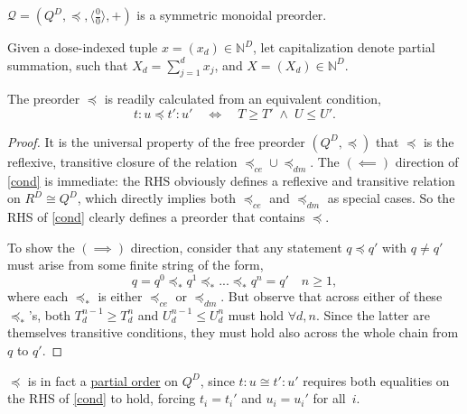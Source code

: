 \documentclass{article}
\newcommand{\N}{\mathbb{N}}
\newcommand{\Q}{\ensuremath{\mathcal{Q}}}
\begin{document}
\begin{fact}\label{symon}
  $\Q = (Q^D,\preceq,\langle\frac{0}{0}\rangle,+)$ is a symmetric monoidal preorder.
\end{fact}

\begin{nota}
  Given a dose-indexed tuple $x = (x_d) \in \N^D$, let capitalization denote partial summation, such that $X_d = \sum_{j=1}^d x_j$, and $X = (X_d) \in \N^D$.
\end{nota}

\begin{fact}
  The preorder $\preceq$ is readily calculated from an equivalent condition,
  \begin{equation}
  t\!:\!u \preceq t'\!:\!u' \quad\iff\quad T \ge T' \;\wedge\; U \le U'.\label{cond}
  \end{equation}
\end{fact}
\begin{proof}
  It is the universal property of the free preorder $(Q^D, \preceq)$ that $\preceq$ is the reflexive, transitive closure of the relation $\preceq_{ce} \cup \preceq_{dm}$.  The $(\!\impliedby\!)$ direction of \eqref{cond} is immediate: the RHS obviously defines a reflexive and transitive relation on $R^D \cong Q^D$, which directly implies both $\preceq_{ce}$ and $\preceq_{dm}$ as special cases.  So the RHS of \eqref{cond} clearly defines a preorder that contains $\preceq$.

  To show the $(\!\implies\!)$ direction, consider that any statement $q \preceq q'$ with $q \neq q'$ must arise from some finite string of the form,
  \begin{equation}
  q = q^0 \preceq_* q^1 \preceq_* ... \preceq_* q^n = q' \quad n \ge 1, \label{string}
  \end{equation}
  where each $\preceq_*$ is either $\preceq_{ce}$ or $\preceq_{dm}$.  But observe that across either of these $\preceq_*$'s, both $T_d^{n-1} \ge T_d^n$ and $U_d^{n-1} \le U_d^n$ must hold $\forall d, n$.  Since the latter are themselves transitive conditions, they must hold also across the whole chain from $q$ to $q'$.  
\end{proof}

\begin{corr}\label{partord}
  $\preceq$ is in fact a \underline{partial order} on $Q^D$, since $t\!:\!u \cong t'\!:\!u'$ requires both equalities on the RHS of \eqref{cond} to hold, forcing $t_i = t_i'$ and $u_i = u_i'$ for all $\,i$.
\end{corr}
\end{document}
